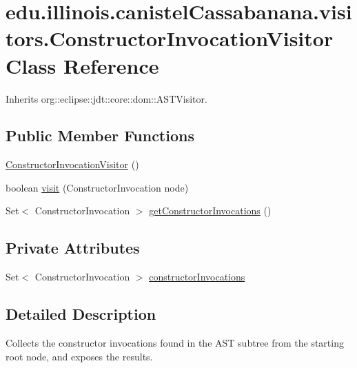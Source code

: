 \hypertarget{classedu_1_1illinois_1_1canistelCassabanana_1_1visitors_1_1ConstructorInvocationVisitor}{
\section{edu.illinois.canistelCassabanana.visitors.ConstructorInvocationVisitor Class Reference}
\label{classedu_1_1illinois_1_1canistelCassabanana_1_1visitors_1_1ConstructorInvocationVisitor}
}


Inherits org::eclipse::jdt::core::dom::ASTVisitor.

\subsection*{Public Member Functions}
\begin{DoxyCompactItemize}
\item 
\hyperlink{classedu_1_1illinois_1_1canistelCassabanana_1_1visitors_1_1ConstructorInvocationVisitor_abd0e8d59b108668ecabc355557d9a76c}{ConstructorInvocationVisitor} ()
\item 
boolean \hyperlink{classedu_1_1illinois_1_1canistelCassabanana_1_1visitors_1_1ConstructorInvocationVisitor_a054819da9d46acfb8fa40315e2097a8c}{visit} (ConstructorInvocation node)
\item 
Set$<$ ConstructorInvocation $>$ \hyperlink{classedu_1_1illinois_1_1canistelCassabanana_1_1visitors_1_1ConstructorInvocationVisitor_a21d38f0c9c6844c2f19c9702b9ca1bca}{getConstructorInvocations} ()
\end{DoxyCompactItemize}
\subsection*{Private Attributes}
\begin{DoxyCompactItemize}
\item 
Set$<$ ConstructorInvocation $>$ \hyperlink{classedu_1_1illinois_1_1canistelCassabanana_1_1visitors_1_1ConstructorInvocationVisitor_afd9567d556bd92a417d0dfdd61e0d77f}{constructorInvocations}
\end{DoxyCompactItemize}


\subsection{Detailed Description}
Collects the constructor invocations found in the AST subtree from the starting root node, and exposes the results.

